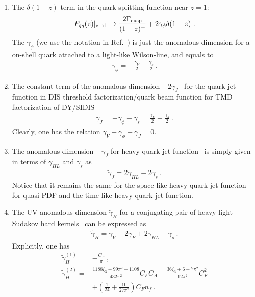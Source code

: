 \documentclass[a4paper,11pt]{article}
\begin{document}
\begin{enumerate}
    \item The $\delta(1-z)$ term in the quark splitting function near $z=1$:
    \begin{align}
    P_{qq}(z)|_{z\rightarrow 1}\rightarrow \frac{2\Gamma_{\rm cusp}}{(1-z)^+}+2\gamma_{\phi} \delta(1-z) \ .
    \end{align}
The $\gamma_{\phi}$ (we use the notation in Ref.~\cite{Becher:2006mr}) is just the anomalous dimension for a on-shell quark attached to a light-like Wilson-line, and equals to
\begin{align}
\gamma_{\phi}=-\frac{\gamma_V}{2}-\frac{\gamma_s}{2} \ .
\end{align}
\item The constant term of the anomalous dimension $-2\gamma_{J}$~\cite{Becher:2006qw,Becher:2006mr} for the quark-jet function in DIS threshold factorization/quark beam function for TMD factorization of DY/SIDIS
\begin{align}
\gamma_{J}=-\gamma_{\phi}-\gamma_s=\frac{\gamma_V}{2}-\frac{\gamma_s}{2} \ .
\end{align}
Clearly, one has the relation $\gamma_{V}+\gamma_{\phi}-\gamma_{J}=0$.
\item The anomalous dimension $-\tilde \gamma_J$ for heavy-quark jet function~\cite{Jain:2008gb} is simply given in terms of $\gamma_{HL}$ and $\gamma_s$ as
\begin{align}
    \tilde \gamma_{J}=2\gamma_{HL}-2\gamma_s \ .
\end{align}
Notice that it remains the same for the space-like heavy quark jet function for quasi-PDF and the time-like heavy quark jet function. 
\item The UV anomalous dimension $\tilde \gamma_{H}$ for a conjugating pair of heavy-light Sudakov hard kernels~\cite{Ji:2019ewn,Ji:2020ect,Ji:2021znw, LPC:2022zci} can be expressed as
\begin{align}\label{eq:heavylighsuda}
\tilde \gamma_{H}=\gamma_{V}+2\gamma_{F}+2\gamma_{HL}-\gamma_s \ .
\end{align}
Explicitly, one has
\begin{align}
\tilde \gamma_H^{(1)}=&-\frac{C_F}{\pi} \ , \\ 
\tilde \gamma_H^{(2)}=&\frac{1188 \zeta_3-99 \pi ^2-1108}{432 \pi ^2}C_FC_A-\frac{36 \zeta_3+6-7 \pi ^2}{12 \pi ^2} C_F^2 \nonumber \\ 
&+\left( \frac{1}{24}+\frac{10}{27 \pi ^2}\right)C_Fn_f \ . \label{eq:tildegammaHresult}
\end{align}

\end{enumerate}
\end{document}
